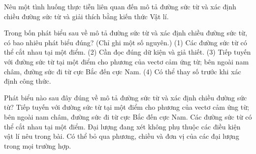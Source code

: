 \begin{bt}
Nêu một tình huống thực tiễn liên quan đến mô tả đường sức từ và xác định chiều đường sức từ và giải thích bằng kiến thức Vật lí.
\end{bt}

\begin{ex}
Trong bốn phát biểu sau về mô tả đường sức từ và xác định chiều đường sức từ, có bao nhiêu phát biểu đúng? (Chỉ ghi một số nguyên.) (1) Các đường sức từ có thể cắt nhau tại một điểm. (2) Cần đọc đúng dữ kiện và giả thiết. (3) Tiếp tuyến với đường sức từ tại một điểm cho phương của vectơ cảm ứng từ; bên ngoài nam châm, đường sức đi từ cực Bắc đến cực Nam. (4) Có thể thay số trước khi xác định công thức.
\end{ex}

\begin{ex}
Phát biểu nào sau đây đúng về mô tả đường sức từ và xác định chiều đường sức từ?
\choice
{\True Tiếp tuyến với đường sức từ tại một điểm cho phương của vectơ cảm ứng từ; bên ngoài nam châm, đường sức đi từ cực Bắc đến cực Nam.}
{Các đường sức từ có thể cắt nhau tại một điểm.}
{Đại lượng đang xét không phụ thuộc các điều kiện vật lí nêu trong bài.}
{Có thể bỏ qua phương, chiều và đơn vị của các đại lượng trong mọi trường hợp.}
\end{ex}

